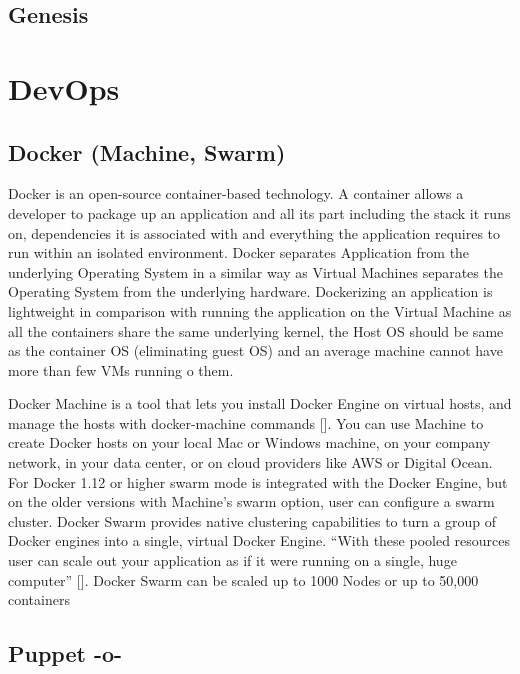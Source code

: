\subsection{Genesis}

\section{DevOps}

\subsection{Docker (Machine, Swarm)}

Docker is an open-source container-based technology. A container
allows a developer to package up an application and all its part
including the stack it runs on, dependencies it is associated with and
everything the application requires to run within an isolated
environment. Docker separates Application from the underlying
Operating System in a similar way as Virtual Machines separates the
Operating System from the underlying hardware. Dockerizing an
application is lightweight in comparison with running the application
on the Virtual Machine as all the containers share the same underlying
kernel, the Host OS should be same as the container OS (eliminating
guest OS) and an average machine cannot have more than few VMs running
o them.

Docker Machine is a tool that lets you install Docker Engine on
virtual hosts, and manage the hosts with docker-machine commands
[\cite{docker-book}]. You can use Machine to create Docker hosts on
your local Mac or Windows machine, on your company network, in your
data center, or on cloud providers like AWS or Digital Ocean. For
Docker 1.12 or higher swarm mode is integrated with the Docker Engine,
but on the older versions with Machine's swarm option, user can
configure a swarm cluster. Docker Swarm provides native clustering
capabilities to turn a group of Docker engines into a single, virtual
Docker Engine. ``With these pooled resources user can scale out your
application as if it were running on a single, huge computer''
[\cite{www-docker}]. Docker Swarm can be scaled up to 1000 Nodes or up
to 50,000 containers
     
\subsection{Puppet -o-}

